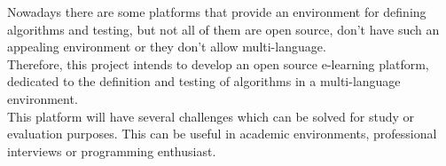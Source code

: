 Nowadays there are some platforms that provide an environment for defining algorithms and testing, but not all of them are open source, don't have such an appealing environment or they don't allow multi-language.
\\
Therefore, this project intends to develop an open source e-learning platform, dedicated to the definition and testing of algorithms in a multi-language environment.
\\
This platform will have several challenges which can be solved for study or evaluation purposes. This can be useful in academic environments, professional interviews or programming enthusiast.

